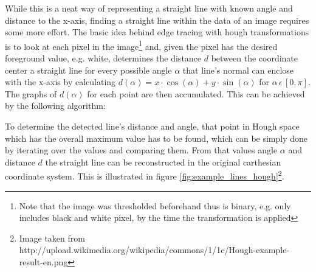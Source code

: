 \documentclass[a4paper, 12pt]{article}
\begin{document}
While this is a neat way of representing a straight line with known angle and
distance to the x-axis, finding a straight line within the data of an image
requires some more effort. The basic idea behind edge tracing with hough
transformations is to look at each pixel in the image\footnote{Note that the
image was thresholded beforehand thus is binary, e.g. only includes black and
white pixel, by the time the transformation is applied} and, given the pixel has
the desired foreground value, e.g. white, determines the distance $d$ between
the coordinate center a straight line for every possible angle $\alpha$ that
line's normal can enclose with the x-axis by calculating $d(\alpha) = x \cdot
\cos(\alpha) + y \cdot \sin(\alpha)$ for $\alpha \, \epsilon \, [0, \pi]$. The
graphs of $d(\alpha)$ for each point are then accumulated. This can be achieved
by the following algorithm:

\begin{center}
\noindent{}
\end{center}

To determine the detected line's distance and angle, that point in Hough space
which has the overall maximum value has to be found, which can be simply done by
iterating over the values and comparing them. From that values angle $\alpha$
and distance $d$ the straight line can be reconstructed in the original
carthesian coordinate system. This is illustrated in figure
\ref{fig:example_lines_hough}\footnote{Image taken from
http://upload.wikimedia.org/wikipedia/commons/1/1c/Hough-example-result-en.png}.
\end{document}
